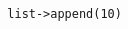 \begin{center}
\begin{minipage}[t]{1\textwidth}
\begin{listing}[H]
\begin{spacing}{1.0}
\begin{verbatim}
  list->append(10)
\end{verbatim}
\end{spacing}
\end{listing}
\end{minipage}
\end{center}
